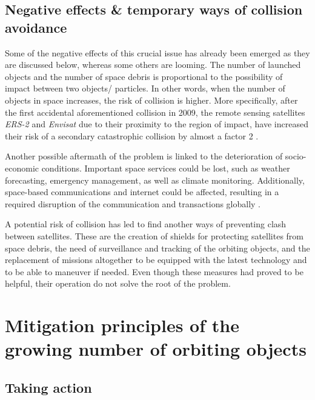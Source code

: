 \bigskip
\subsection{Negative effects \& temporary ways of collision avoidance}
\bigskip

Some of the negative effects of this crucial issue has already been emerged as they are discussed below, whereas some others are looming. The number of launched objects and the number of space debris is proportional to the possibility of impact between two objects/ particles. In other words, when the number of objects in space increases, the risk of collision is higher. More specifically, after the first accidental aforementioned collision in 2009, the remote sensing satellites \textit{ERS-2} and \textit{Envisat} due to their proximity to the region of impact, have increased their risk of a secondary catastrophic collision by almost a factor 2 \cite{Klinkrad 2009}.

Another possible aftermath of the problem is linked to the deterioration of socio-economic conditions. Important space services could be lost, such as weather forecasting, emergency management, as well as climate monitoring. Additionally, space-based communications and internet could be affected, resulting in a required disruption of the communication and transactions globally \cite{Undseth}.

\bigskip

A potential risk of collision has led to find another ways of preventing clash between satellites. These are the creation of shields for protecting satellites from space debris, the need of surveillance and tracking of the orbiting objects, and the replacement of missions altogether to be equipped with the latest technology and to be able to maneuver if needed. Even though these measures had proved to be helpful, their operation do not solve the root of the problem.


\bigskip
\section{Mitigation principles of the growing number of orbiting objects}
\label{chap:mitigation}
\bigskip

\bigskip
\subsection{Taking action}
\bigskip


